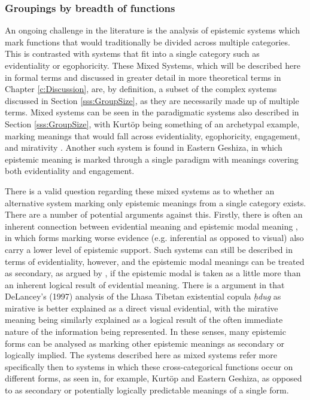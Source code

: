 \subsubsection{Groupings by breadth of functions}\label{sss:Description:MixedSystems}
An ongoing challenge in the literature is the analysis of epistemic systems which mark functions that would traditionally be divided across multiple categories. This is contrasted with systems that fit into a single category such as evidentiality or egophoricity. These Mixed Systems, which will be described here in formal terms and discussed in greater detail in more theoretical terms in Chapter \ref{c:Discussion}, are, by definition, a subset of the complex systems discussed in Section \ref{sss:GroupSize}, as they are necessarily made up of multiple terms. Mixed systems can be seen in the paradigmatic systems also described in Section \ref{sss:GroupSize}, with Kurtöp being something of an archetypal example, marking meanings that would fall across evidentiality, egophoricity, engagement, and mirativity \cite{Hyslop2020Kurtop}. Another such system is found in Eastern Geshiza, in which epistemic meaning is marked through a single paradigm with meanings covering both evidentiality and engagement. 

There is a valid question regarding these mixed systems as to whether an alternative system marking only epistemic meanings from a single category exists. There are a number of potential arguments against this. Firstly, there is often an inherent connection between evidential meaning and epistemic modal meaning \cite{Boye2012}, in which forms marking worse evidence (e.g. inferential as opposed to visual) also carry a lower level of epistemic support. Such systems can still be described in terms of evidentiality, however, and the epistemic modal meanings can be treated as secondary, as argued by , if the epistemic modal is taken as a little more than an inherent logical result of evidential meaning. There is a argument in  that DeLancey's (1997) analysis of the Lhasa Tibetan existential copula \textit{ḥdug} as mirative is better explained as a direct visual evidential, with the mirative meaning being similarly explained as a logical result of the often immediate nature of the information being represented. In these senses, many epistemic forms can be analysed as marking other epistemic meanings as secondary or logically implied. The systems described here as mixed systems refer more specifically then to systems in which these cross-categorical functions occur on different forms, as seen in, for example, Kurtöp and Eastern Geshiza, as opposed to as secondary or potentially logically predictable meanings of a single form.

